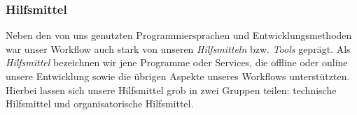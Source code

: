 
\subsubsection{Hilfsmittel}
\label{team:orga-workflow-tools}
\vspace{-0.1cm}

Neben den von uns genutzten Programmiersprachen und Entwicklungsmethoden war
unser Workflow auch stark von unseren \emph{Hilfsmitteln} bzw. \emph{Tools}
geprägt. Als \emph{Hilfsmittel} bezeichnen wir jene Programme oder Services, die
offline oder online unsere Entwicklung sowie die übrigen Aspekte unseres
Workflows unterstützten. Hierbei lassen sich unsere Hilfsmittel grob in zwei
Gruppen teilen: technische Hilfsmittel und organisatorische Hilfsmittel.

